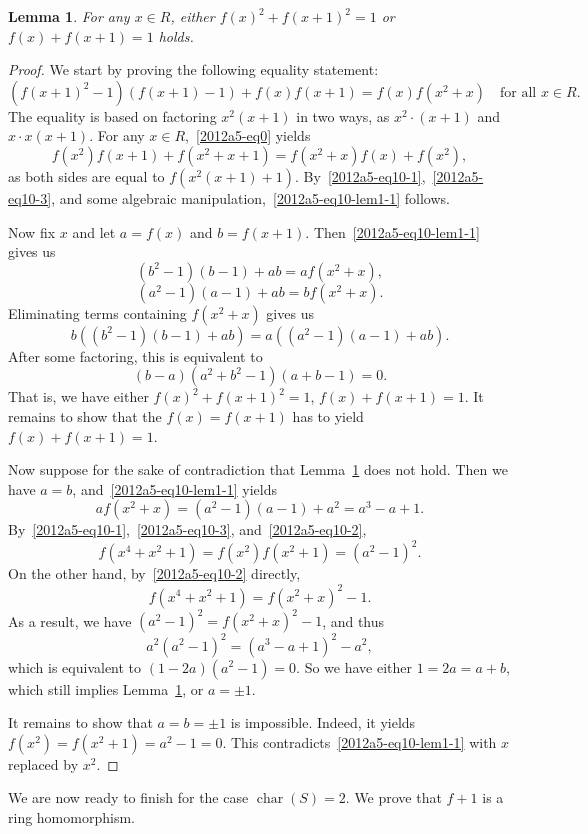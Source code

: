 \documentclass{article}
\DeclareMathOperator{\rchar}{char}
\newtheorem{lemma}{Lemma}
\begin{document}
\begin{lemma}\label{2012a5-10-1}
For any $x \in R$, either $f(x)^2 + f(x + 1)^2 = 1$ or $f(x) + f(x + 1) = 1$ holds.
\end{lemma}
\begin{proof}
We start by proving the following equality statement:
\[ (f(x + 1)^2 - 1)(f(x + 1) - 1) + f(x) f(x + 1) = f(x) f(x^2 + x) \quad \text{for all } x \in R. \tag{10.L1.1}\label{2012a5-eq10-lem1-1} \]
The equality is based on factoring $x^2 (x + 1)$ in two ways, as $x^2 \cdot (x + 1)$ and $x \cdot x(x + 1)$.
For any $x \in R$,~\eqref{2012a5-eq0} yields
\[ f(x^2) f(x + 1) + f(x^2 + x + 1) = f(x^2 + x) f(x) + f(x^2), \]
    as both sides are equal to $f(x^2 (x + 1) + 1)$.
By~\eqref{2012a5-eq10-1},~\eqref{2012a5-eq10-3}, and some algebraic manipulation,~\eqref{2012a5-eq10-lem1-1} follows.

Now fix $x$ and let $a = f(x)$ and $b = f(x + 1)$.
Then~\eqref{2012a5-eq10-lem1-1} gives us
\[ (b^2 - 1)(b - 1) + ab = a f(x^2 + x), \]
\[ (a^2 - 1)(a - 1) + ab = b f(x^2 + x). \]
Eliminating terms containing $f(x^2 + x)$ gives us
\[ b((b^2 - 1)(b - 1) + ab) = a((a^2 - 1)(a - 1) + ab). \]
After some factoring, this is equivalent to
\[ (b - a)(a^2 + b^2 - 1)(a + b - 1) = 0. \]
That is, we have either $f(x)^2 + f(x + 1)^2 = 1$, $f(x) + f(x + 1) = 1$.
It remains to show that the $f(x) = f(x + 1)$ has to yield $f(x) + f(x + 1) = 1$.

Now suppose for the sake of contradiction that Lemma~\ref{2012a5-10-1} does not hold.
Then we have $a = b$, and~\eqref{2012a5-eq10-lem1-1} yields
\[ a f(x^2 + x) = (a^2 - 1)(a - 1) + a^2 = a^3 - a + 1. \]
By~\eqref{2012a5-eq10-1},~\eqref{2012a5-eq10-3}, and~\eqref{2012a5-eq10-2},
\[ f(x^4 + x^2 + 1) = f(x^2) f(x^2 + 1) = (a^2 - 1)^2. \]
On the other hand, by~\eqref{2012a5-eq10-2} directly,
\[ f(x^4 + x^2 + 1) = f(x^2 + x)^2 - 1. \]
As a result, we have $(a^2 - 1)^2 = f(x^2 + x)^2 - 1$, and thus
\[ a^2 (a^2 - 1)^2 = (a^3 - a + 1)^2 - a^2, \]
    which is equivalent to $(1 - 2a)(a^2 - 1) = 0$.
So we have either $1 = 2a = a + b$, which still implies Lemma~\ref{2012a5-10-1}, or $a = \pm 1$.

It remains to show that $a = b = \pm 1$ is impossible.
Indeed, it yields $f(x^2) = f(x^2 + 1) = a^2 - 1 = 0$.
This contradicts~\eqref{2012a5-eq10-lem1-1} with $x$ replaced by $x^2$.
\end{proof}

We are now ready to finish for the case $\rchar(S) = 2$.
We prove that $f + 1$ is a ring homomorphism.
\end{document}
